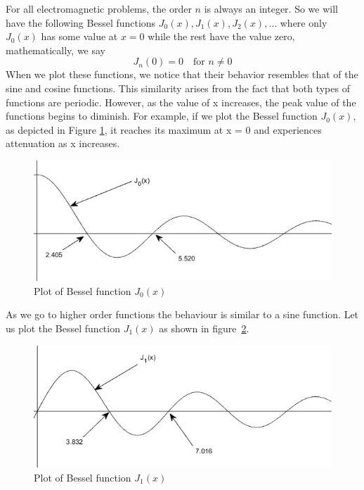 For all electromagnetic problems, the order $n$ is always an integer. So we will have the following Bessel functions $ J_0(x), J_1(x), J_2(x), \ldots$ where only $J_0(x)$ has some value at $x=0$ while the rest have the value zero, mathematically, we say 
\[
J_n(0)=0\quad\text{for }n \neq 0
\]
When we plot these functions, we notice that their behavior resembles that of the sine and cosine functions. This similarity arises from the fact that both types of functions are periodic. However, as the value of x increases, the peak value of the functions begins to diminish. For example, if we plot the Bessel function $J_0(x)$, as depicted in Figure \ref{fig:fig1}, it reaches its maximum at x = 0 and experiences attenuation as x increases.
\begin{figure}[h]
\centering
\includegraphics[width=1\linewidth]{./graphics/fig_1.1}
\caption{Plot of Bessel function $J_0(x)$}
\label{fig:fig1}
\end{figure}

As we go to higher order functions the behaviour is similar to a sine function. Let us plot the Bessel function $J_1(x)$ as shown in figure~\ref{fig:fig2}.
\begin{figure}[h]
\centering
\includegraphics[width=1\linewidth]{./graphics/fig_2.1}
\caption{Plot of Bessel function $J_1(x)$}
\label{fig:fig2}
\end{figure}

